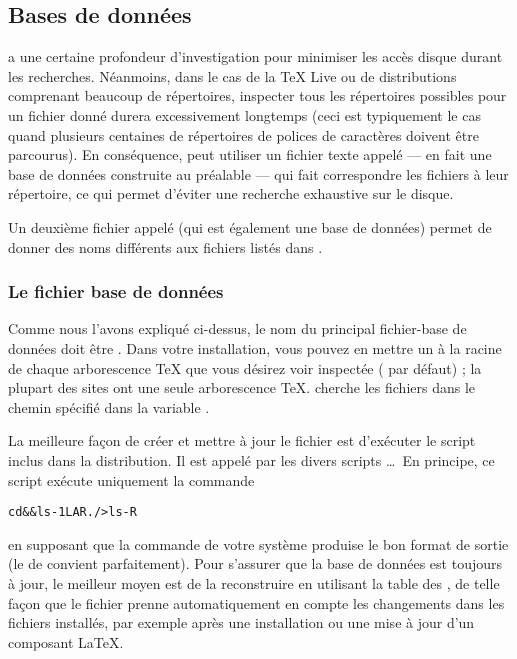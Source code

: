 \documentclass[german, english, french, 12pt]{article}
\renewcommand{\TL}{\TeX{} Live\xspace}%
\begin{document}
\subsection{Bases de données}
\label{sec:filename-database}

\KPS{} a une certaine profondeur d'investigation pour minimiser les accès disque
durant les recherches. Néanmoins, dans le cas de la \TL{} ou de distributions
comprenant beaucoup de répertoires, inspecter tous les répertoires possibles
pour un fichier donné durera excessivement longtemps (ceci est typiquement le
cas quand plusieurs centaines de répertoires de polices de caractères doivent
être parcourus). En conséquence, \KPS{} peut utiliser un fichier texte appelé
 --- en fait une base de données construite au préalable --- qui fait
correspondre les fichiers à leur répertoire, ce qui permet d'éviter une
recherche exhaustive sur le disque.

Un deuxième fichier appelé  (qui est également une base de
données) permet de donner des noms différents aux fichiers listés dans
\mbox{}.

\subsubsection{Le fichier base de données}
\label{sec:ls-R}

Comme nous l'avons expliqué ci-dessus, le nom du principal fichier-base de
données doit être \mbox{}.  Dans votre installation, vous pouvez en
mettre un à la racine de chaque arborescence \TeX{} que vous désirez voir
inspectée ( par défaut) ; la plupart des sites ont une seule
arborescence \TeX{}.  \KPS{} cherche les fichiers  dans le chemin
spécifié dans la variable .

La meilleure façon de créer et mettre à jour le fichier  est
d'exécuter le script  inclus dans la distribution. Il est
appelé par les divers scripts \dots\ En principe, ce script
exécute uniquement la commande
\begin{alltt}
cd  && \boi{}ls -1LAR ./ >ls-R
\end{alltt}
en supposant que la commande  de votre système produise le bon format
de sortie (le  de \GNU convient parfaitement). Pour s'assurer que la
base de données est toujours à jour, le meilleur moyen est de la reconstruire en
utilisant la table des , de telle façon que le fichier 
prenne automatiquement en compte les changements dans les fichiers installés,
par exemple après une installation ou une mise à jour d'un composant \LaTeX{}.
\end{document}
